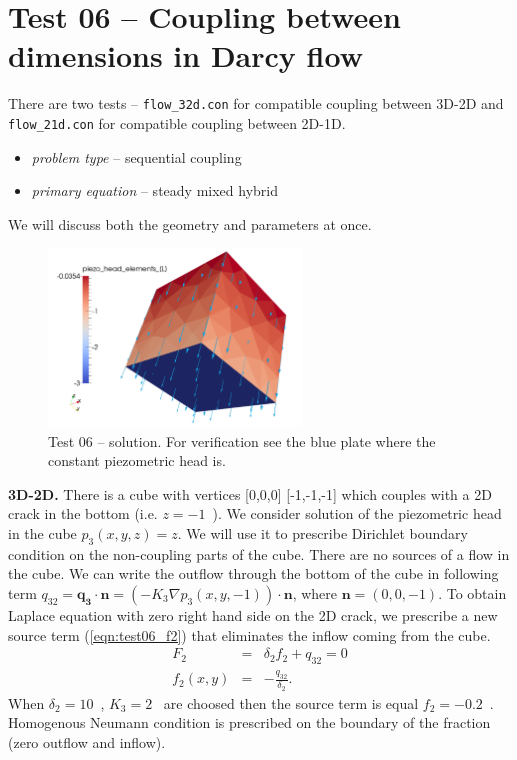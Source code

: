 
\section{Test 06 -- Coupling between dimensions in Darcy flow}
\label{sec:test06}
There are two tests -- \verb'flow_32d.con' for compatible coupling between 3D-2D and \verb'flow_21d.con' for compatible coupling between 2D-1D.

\begin{itemize} 
    \item \emph{problem type} -- sequential coupling 
    \item \emph{primary equation} -- steady mixed hybrid
  \end{itemize}

We will discuss both the geometry and parameters at once.

%
\begin{figure}[h!]
\centering
\includegraphics[width=0.6\textwidth]{tests_graphics/06_result_32d.pdf}
\caption{Test 06 -- solution. For verification see the blue plate where the constant piezometric head is.}
\label{fig:test6_solution_32d}
\end{figure}
%
\textbf{3D-2D.}
There is a cube with vertices [0,0,0] [-1,-1,-1] which couples with a 2D crack in the bottom (i.e. $z=-1$~).
We consider solution of the piezometric head in the cube $p_3(x,y,z) = z$. We will use it to prescribe Dirichlet boundary condition on the non-coupling parts of the cube.
There are no sources of a flow in the cube. 
We can write the outflow through the bottom of the cube in following term $q_{32} = \mathbf{q_3} \cdot \mathbf{n} = (- K_3 \nabla p_3(x,y,-1))\cdot \mathbf{n}$,
where $\mathbf{n}=(0,0,-1)$.
To obtain Laplace equation with zero right hand side on the 2D crack, we prescribe a new source term (\ref{eqn:test06_f2}) that eliminates the inflow coming from the cube.         
\begin{eqnarray}
    F_2 &=& \delta_2  f_2 + q_{32} = 0   \nonumber\\
    f_2(x,y) &=& -\frac{q_{32}}{\delta_2}   \label{eqn:test06_f2}.
\end{eqnarray}
When $\delta_2 = 10$~, $K_3 = 2$~ are choosed then the source term is equal $f_2 = -0.2$~.
Homogenous Neumann condition is prescribed on the boundary of the fraction (zero outflow and inflow).

